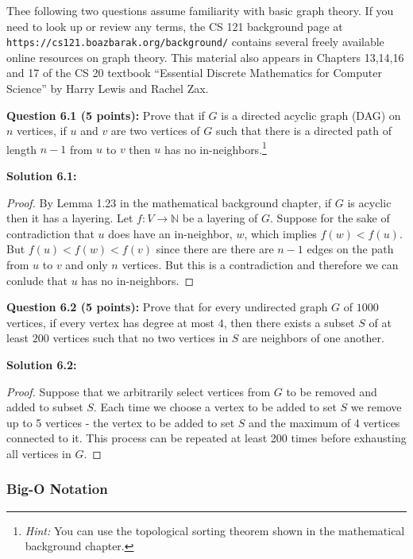 \documentclass[11pt]{article}
\begin{document}
Thee following two questions assume familiarity with basic graph theory.
If you need to look up or review any terms, the CS 121 background page at
{\tt https://cs121.boazbarak.org/background/}
contains several freely available online resources on graph theory. This
material also appears in Chapters 13,14,16 and 17 of the CS 20 textbook
``Essential Discrete Mathematics for Computer Science'' by Harry Lewis
and Rachel Zax.

\textbf{Question 6.1 (5 points):} Prove that if \(G\) is a directed
acyclic graph (DAG) on \(n\) vertices, if \(u\) and \(v\) are two
vertices of \(G\) such that there is a directed path of length \(n-1\)
from \(u\) to \(v\) then \(u\) has no in-neighbors.\footnote{\emph{Hint:}
  You can use the topological sorting theorem shown in the mathematical
  background chapter.}

\textbf{Solution 6.1:}
\begin{proof}
  By Lemma 1.23 in the mathematical background chapter, if $G$ is acyclic then it
  has a layering. Let $f : V \rightarrow \mathbb{N}$ be a layering of $G$. 
  Suppose for the sake of contradiction that $u$ does have an in-neighbor, $w$, 
  which implies $f(w) < f(u)$. But $f(u) < f(w) < f(v)$ since there are there are 
  $n-1$ edges on the path from $u$ to $v$ and only $n$ vertices. But this is a 
  contradiction and therefore we can conlude that $u$ has no in-neighbors.
\end{proof}

\textbf{Question 6.2 (5 points):} Prove that for every undirected graph
\(G\) of \(1000\) vertices, if every vertex has degree at most \(4\),
then there exists a subset \(S\) of at least \(200\) vertices such that
no two vertices in \(S\) are neighbors of one another.

\textbf{Solution 6.2:}
\begin{proof}
  Suppose that we arbitrarily select vertices from $G$ to be removed
  and added to subset $S$. Each time we choose a vertex to be added to set $S$ we remove
  up to 5 vertices - the vertex to be added to set $S$ and the maximum of 4 vertices
  connected to it. This process can be repeated at least 200 times before exhausting
  all vertices in $G$.
\end{proof}

\newpage

\subsubsection{Big-O Notation}\label{big-o-notation}
\end{document}
